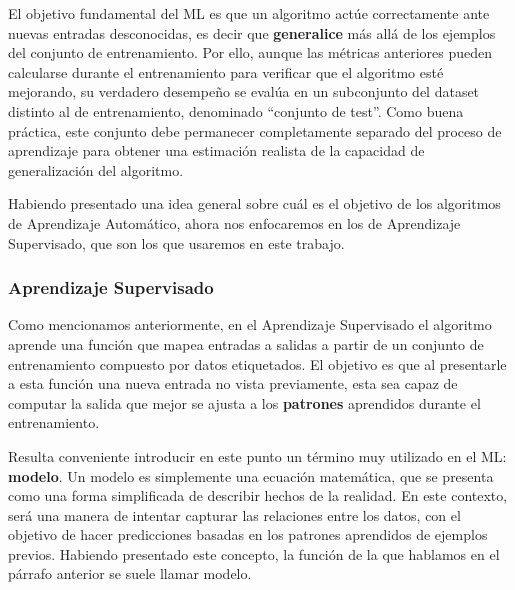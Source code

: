 \documentclass[../../main.tex]{subfiles}
\begin{document}
El objetivo fundamental del ML es que un algoritmo actúe correctamente ante nuevas entradas desconocidas, es decir que \textbf{generalice} más allá de los ejemplos del conjunto de entrenamiento. Por ello, aunque las métricas anteriores pueden calcularse durante el entrenamiento para verificar que el algoritmo esté mejorando, su verdadero desempeño se evalúa en un subconjunto del dataset distinto al de entrenamiento, denominado ``conjunto de test''. Como buena práctica, este conjunto debe permanecer completamente separado del proceso de aprendizaje para obtener una estimación realista de la capacidad de generalización del algoritmo.

\bigskip
Habiendo presentado una idea general sobre cuál es el objetivo de los algoritmos de Aprendizaje Automático, ahora nos enfocaremos en los de Aprendizaje Supervisado, que son los que usaremos en este trabajo.

\begin{comment}
En este contexto, un modelo será una forma de intentar capturar las relaciones entre los datos, con el objetivo de hacer predicciones o tomar decisiones basadas en patrones aprendidos de ejemplos previos. 
\end{comment}

\subsubsection{Aprendizaje Supervisado}
Como mencionamos anteriormente, en el Aprendizaje Supervisado el algoritmo aprende una función que mapea entradas a salidas a partir de un conjunto de entrenamiento compuesto por datos etiquetados. El objetivo es que al presentarle a esta función una nueva entrada no vista previamente, esta sea capaz de computar la salida que mejor se ajusta a los \textbf{patrones} aprendidos durante el entrenamiento.

Resulta conveniente introducir en este punto un término muy utilizado en el ML: \textbf{modelo}. Un modelo es simplemente una ecuación matemática, que se presenta como una forma simplificada de describir hechos de la realidad. En este contexto, será una manera de intentar capturar las relaciones entre los datos, con el objetivo de hacer predicciones basadas en los patrones aprendidos de ejemplos previos. Habiendo presentado este concepto, la función de la que hablamos en el párrafo anterior se suele llamar modelo.
\end{document}
